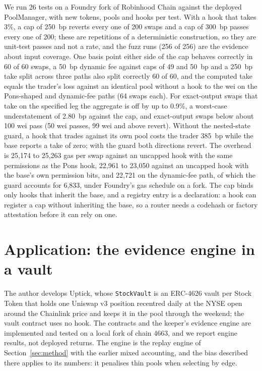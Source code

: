 \documentclass[11pt]{article}
\begin{document}
We run 26 tests on a Foundry fork of Robinhood Chain against the deployed PoolManager, with new tokens, pools and hooks per test. With a hook that takes 3\%, a cap of 250~bp reverts every one of 200 swaps and a cap of 300~bp passes every one of 200; these are repetitions of a deterministic construction, so they are unit-test passes and not a rate, and the fuzz runs (256 of 256) are the evidence about input coverage. One basis point either side of the cap behaves correctly in 60 of 60 swaps, a 50~bp dynamic fee against caps of 49 and 50~bp and a 250~bp take split across three paths also split correctly 60 of 60, and the computed take equals the trader's loss against an identical pool without a hook to the wei on the Pons-shaped and dynamic-fee paths (64 swaps each). For exact-output swaps that take on the specified leg the aggregate is off by up to 0.9\%, a worst-case understatement of 2.80~bp against the cap, and exact-output swaps below about 100 wei pass (50 wei passes, 99 wei and above revert). Without the nested-state guard, a hook that trades against its own pool costs the trader 385~bp while the base reports a take of zero; with the guard both directions revert. The overhead is 25,174 to 25,263 gas per swap against an uncapped hook with the same permissions as the Pons hook, 22,961 to 23,050 against an uncapped hook with the base's own permission bits, and 22,721 on the dynamic-fee path, of which the guard accounts for 6,833, under Foundry's gas schedule on a fork. The cap binds only hooks that inherit the base, and a registry entry is a declaration: a hook can register a cap without inheriting the base, so a router needs a codehash or factory attestation before it can rely on one.

\section{Application: the evidence engine in a vault}\label{app:product}

The author develops Uptick, whose \texttt{StockVault} is an ERC-4626 vault per Stock Token that holds one Uniswap v3 position recentred daily at the NYSE open around the Chainlink price and keeps it in the pool through the weekend; the vault contract uses no hook. The contracts and the keeper's evidence engine are implemented and tested on a local fork of chain 4663, and we report engine results, not deployed returns. The engine is the replay engine of Section~\ref{sec:method} with the earlier mixed accounting, and the bias described there applies to its numbers: it penalises thin pools when selecting by edge.
\end{document}
